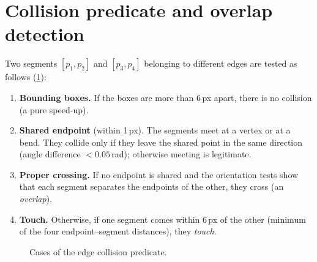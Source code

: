 \documentclass[11pt,a4paper]{article}
\begin{document}
\section{Collision predicate and overlap detection}
\label{sec:collide}

Two segments $[p_1,p_2]$ and $[p_3,p_4]$ belonging to different edges are tested as follows (\cref{fig:collide}):
\begin{enumerate}
  \item \textbf{Bounding boxes.} If the boxes are more than 6\,px apart, there is no collision (a pure speed-up).
  \item \textbf{Shared endpoint} (within 1\,px). The segments meet at a vertex or at a bend. They collide only if they leave the shared point in the same direction (angle difference $<0.05$\,rad); otherwise meeting is legitimate.
  \item \textbf{Proper crossing.} If no endpoint is shared and the orientation tests show that each segment separates the endpoints of the other, they cross (an \emph{overlap}).
  \item \textbf{Touch.} Otherwise, if one segment comes within 6\,px of the other (minimum of the four endpoint--segment distances), they \emph{touch}.
\end{enumerate}

\begin{figure}[ht]
\centering
{}
\caption{Cases of the edge collision predicate.}
\label{fig:collide}
\end{figure}
\end{document}
